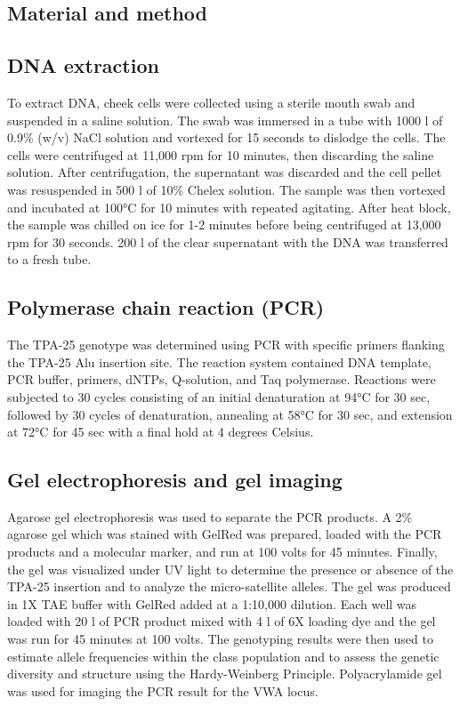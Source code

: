 \documentclass[a4paper,10pt]{article}
\begin{document}
\begin{multicols}{2}
\section{Material and method}
\subsection{DNA extraction}
To extract DNA, cheek cells were collected using a sterile mouth swab and suspended in a saline solution. The swab was immersed in a tube with 1000 \textmu l of 0.9\% (w/v) NaCl solution and vortexed for 15 seconds to dislodge the cells. The cells were centrifuged at 11,000 rpm for 10 minutes, then discarding the saline solution. After centrifugation, the supernatant was discarded and the cell pellet was resuspended in 500 \textmu l of 10\% Chelex solution. The sample was then vortexed and incubated at 100°C for 10 minutes with repeated agitating. After heat block, the sample was chilled on ice for 1-2 minutes before being centrifuged at 13,000 rpm for 30 seconds. 200 \textmu l of the clear supernatant with the DNA was transferred to a fresh tube.


\subsection{Polymerase chain reaction (PCR)}
The TPA-25 genotype was determined using PCR with specific primers flanking the TPA-25 Alu insertion site. The reaction system contained DNA template, PCR buffer, primers, dNTPs, Q-solution, and Taq polymerase. Reactions were subjected to 30 cycles consisting of an initial denaturation at 94°C for 30 sec, followed by 30 cycles of denaturation, annealing at 58°C for 30 sec, and extension at 72°C  for 45 sec with a final hold at 4 degrees Celsius.


\subsection{Gel electrophoresis and gel imaging }
Agarose gel electrophoresis was used to separate the PCR products. A 2\% agarose gel which was stained with GelRed was prepared, loaded with the PCR products and a molecular marker, and run at 100 volts for 45 minutes. Finally, the gel was visualized under UV light to determine the presence or absence of the TPA-25 insertion and to analyze the micro-satellite alleles. The gel was produced in 1X TAE buffer with GelRed added at a 1:10,000 dilution. Each well was loaded with 20 \textmu l of PCR product mixed with 4 \textmu l of 6X loading dye and the gel was run for 45 minutes at 100 volts. The genotyping results were then used to estimate allele frequencies within the class population and to assess the genetic diversity and structure using the Hardy-Weinberg Principle. Polyacrylamide gel was used for imaging the PCR result for the VWA locus.



\end{multicols}
\end{document}

